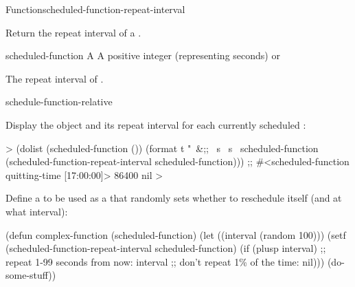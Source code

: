 \documentclass[10pt,twoside,english,pdftex]{article}
\begin{document}
\begin{functiondoc}{Function}{scheduled-function-repeat-interval}%
  {
    }
%
%

\fnsyntax

\fnpurpose Return the repeat interval of a .

\fnsetf
{}%
  {}{}

\fnpackage {}

\fnmodule {}

\fnargs
\begin{args}{scheduled-function}
 A 
 A positive integer (representing seconds) or \nil
\end{args}

\fnreturns The repeat interval of . 

\begin{alsos}{schedule-function-relative}
\end{alsos}

%
\fnexamples
% 
Display the  object and its repeat interval
for each currently scheduled :
%
\W\supp
\begin{example}
  > (dolist (scheduled-function ())
     (format t "~&;; ~s ~s~%
             scheduled-function
             (scheduled-function-repeat-interval scheduled-function)))
  ;; #<scheduled-function quitting-time [17:00:00]> 86400
  nil
  >
\end{example}

Define a  to be used as a  that
randomly sets whether to reschedule itself (and at what interval):
%
\W\supp
\begin{example}
  (defun complex-function (scheduled-function)
    (let ((interval (random 100)))
      (setf (scheduled-function-repeat-interval scheduled-function)
            (if (plusp interval) 
                ;; repeat 1-99 seconds from now:
                interval
                ;; don't repeat 1\% of the time:
                nil)))
    (do-some-stuff))
\end{example}

\end{functiondoc}
\end{document}
